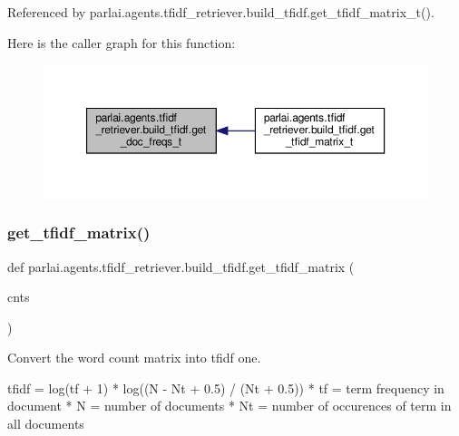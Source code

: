 Referenced by parlai.\+agents.\+tfidf\+\_\+retriever.\+build\+\_\+tfidf.\+get\+\_\+tfidf\+\_\+matrix\+\_\+t().

Here is the caller graph for this function\+:
\nopagebreak
\begin{figure}[H]
\begin{center}
\leavevmode
\includegraphics[width=350pt]{namespaceparlai_1_1agents_1_1tfidf__retriever_1_1build__tfidf_a284d006ecb031c337c64d7debe1407d3_icgraph}
\end{center}
\end{figure}
\mbox{\label{namespaceparlai_1_1agents_1_1tfidf__retriever_1_1build__tfidf_acce651a5b40c5a3b4009181f22c69eaa}} 
\subsubsection{\texorpdfstring{get\+\_\+tfidf\+\_\+matrix()}{get\_tfidf\_matrix()}}
{\footnotesize\ttfamily def parlai.\+agents.\+tfidf\+\_\+retriever.\+build\+\_\+tfidf.\+get\+\_\+tfidf\+\_\+matrix (\begin{DoxyParamCaption}\item[{}]{cnts }\end{DoxyParamCaption})}

\begin{DoxyVerb}Convert the word count matrix into tfidf one.

tfidf = log(tf + 1) * log((N - Nt + 0.5) / (Nt + 0.5))
* tf = term frequency in document
* N = number of documents
* Nt = number of occurences of term in all documents
\end{DoxyVerb}
 

